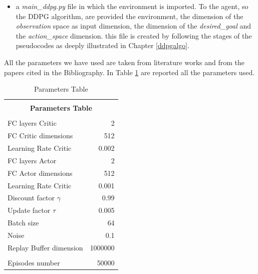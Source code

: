 \documentclass[a4paper]{report}
\begin{document}
\begin{itemize}
\item a \textit{main\_ddpg.py} file in which the environment is imported. To the agent, so the DDPG algorithm, are provided the environment, the dimension of the \textit{observation} space as input dimension, the dimension of the \textit{desired\_goal} and the \textit{action\_space} dimension. this file is created by following the stages of the pseudocodes as deeply illustrated in Chapter \ref{ddpgalgo}.

\end{itemize}

All the parameters we have used are taken from literature works and from the papers cited in the Bibliography. In Table \ref{table} are reported all the parameters used.
\\

\begin{table}[h]
\begin{center}
\begin{tabular}{|l|r|} 



\hline

\multicolumn{2}{|c|}{}\\
\multicolumn{2}{|c|}{\textbf{\Large            Parameters Table}}\\
\multicolumn{2}{|c|}{}\\

\hline

FC layers Critic 			& 2			\\
FC Critic dimensions		& 512		\\
Learning Rate Critic 		& 0.002		\\
FC layers Actor 			& 2			\\
FC Actor dimensions 		& 512		\\
Learning Rate Critic 		& 0.001		\\
Discount factor $\gamma$	& 0.99		\\
Update factor $\tau$		& 0.005		\\	%
Batch size					& 64		\\
Noise						& 0.1		\\
Replay Buffer dimension		& 1000000	\\
							&			\\
Episodes number				& 50000		\\


\hline
\end{tabular}
\end{center}
\caption{\label{table} Parameters Table}
\end{table}
\end{document}

